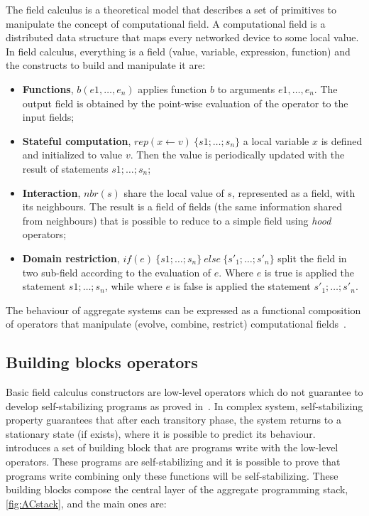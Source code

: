 The field calculus is a theoretical model that describes a set of primitives to manipulate the concept of computational field. A computational field is a distributed data structure that maps every networked device to some local value. In field calculus, everything is a field (value, variable, expression, function) and the constructs to build and manipulate it are:
\begin{itemize}
    \item \textbf{Functions}, $b(e1,\dots,e_n)$ applies function $b$ to arguments $e1,\dots,e_n$. The output field is obtained by the point-wise evaluation of the operator to the input fields;
    \item \textbf{Stateful computation}, $rep(x \leftarrow v)~\{s1; \dots ; s_n\}$ a local variable $x$ is defined and initialized to value $v$. Then the value is periodically updated with the result of statements $s1; \dots ; s_n$;
    \item \textbf{Interaction}, $nbr(s)$ share the local value of $s$, represented as a field, with its neighbours. The result is a field of fields (the same information shared from neighbours) that is possible to reduce to a simple field using \textit{hood} operators;
    \item \textbf{Domain restriction}, $if(e)~\{s1; \dots ; s_n\}~else~\{s'_1; \dots ; s'_n\}$ split the field in two sub-field according to the evaluation of $e$. Where $e$ is true is applied the statement $s1; \dots ; s_n$, while where $e$ is false is applied the statement $s'_1; \dots ; s'_n$.
\end{itemize}

The behaviour of aggregate systems can be expressed as a functional composition of operators that manipulate (evolve, combine, restrict) computational fields~\cite{type-sound}.

\subsection{Building blocks operators}
Basic field calculus constructors are low-level operators which do not guarantee to develop self-stabilizing programs as proved in~\cite{DBLP:journals/corr/abs-1711-08297}.
In complex system, self-stabilizing property guarantees that after each transitory phase, the system returns to a stationary state (if exists), where it is possible to predict its behaviour. 
\cite{buildingBlock} introduces a set of building block that are programs write with the low-level operators.
These programs are self-stabilizing and it is possible to prove that programs write combining only these functions will be self-stabilizing.
These building blocks compose the central layer of the aggregate programming stack, \autoref{fig:ACstack}, and the main ones are:

